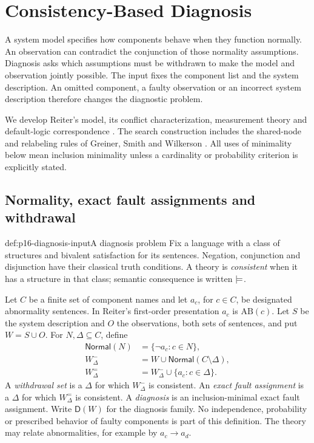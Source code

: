 \chapter{Consistency-Based Diagnosis}
\label{sec:p16-consistency-based-diagnosis}

A system model specifies how components behave when they function
normally. An observation can contradict the conjunction of those
normality assumptions. Diagnosis asks which assumptions must be
withdrawn to make the model and observation jointly possible.
The input fixes the component list and the system description.
An omitted component, a faulty observation or an incorrect system
description therefore changes the diagnostic problem.

We develop Reiter's model, its conflict characterization, measurement
theory and default-logic correspondence
\cite{Reiter1987Diagnosis}. The search construction includes the
shared-node and relabeling rules of Greiner, Smith and Wilkerson
\cite[secs.~3--4, author version]{GreinerSmithWilkerson1989Correction}.
All uses of minimality below mean inclusion minimality unless a
cardinality or probability criterion is explicitly stated.

\section{Normality, exact fault assignments and withdrawal}
\label{sec:p16-diagnosis-semantics}

\begin{hbdefinition}{def:p16-diagnosis-input}{A diagnosis problem}
Fix a language with a class of structures and bivalent satisfaction
for its sentences. Negation, conjunction and disjunction have their
classical truth conditions. A theory is \emph{consistent} when it
has a structure in that class; semantic consequence is written
\(\models\).

Let \(C\) be a finite set of component names and let
\(a_c\), for \(c\in C\), be designated abnormality sentences.
In Reiter's first-order presentation \(a_c\) is
\(\mathrm{AB}(c)\). Let \(S\) be the system description and \(O\)
the observations, both sets of sentences, and put \(W=S\cup O\).
For \(N,\Delta\subseteq C\), define
\[
\begin{split}
 \mathsf{Normal}(N)&=\{\neg a_c:c\in N\},\\
 W^-_\Delta&=W\cup\mathsf{Normal}(C\setminus\Delta),\\
 W^=_\Delta&=W^-_\Delta\cup\{a_c:c\in\Delta\}.
\end{split}
\]
A \emph{withdrawal set} is a \(\Delta\) for which \(W^-_\Delta\)
is consistent. An \emph{exact fault assignment} is a \(\Delta\)
for which \(W^=_\Delta\) is consistent. A \emph{diagnosis} is
an inclusion-minimal exact fault assignment. Write
\(\mathsf D(W)\) for the diagnosis family.
No independence, probability or prescribed behavior of faulty
components is part of this definition. The theory may relate
abnormalities, for example by \(a_c\to a_d\).
\end{hbdefinition}


